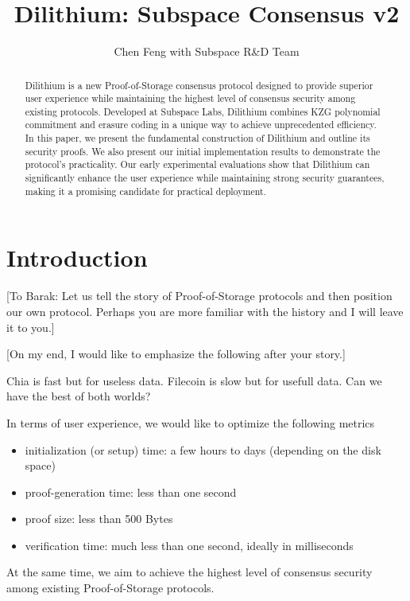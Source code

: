 \documentclass[12pt,draftcls,onecolumn]{IEEEtran}
\title{Dilithium: Subspace Consensus v2}
\author{Chen Feng with Subspace R\&D Team}
\begin{document}
\maketitle

\begin{abstract}
    Dilithium is a new Proof-of-Storage consensus protocol designed to provide superior
    user experience while maintaining the highest level 
    of consensus security among existing protocols.
    Developed at Subspace Labs, Dilithium combines KZG polynomial commitment and erasure coding
    in a unique way to achieve unprecedented efficiency. 
    In this paper, we present the fundamental construction of Dilithium
    and outline its security proofs. We also present our initial implementation results to demonstrate the protocol's practicality.
    Our early experimental evaluations show that Dilithium can significantly enhance the user experience while maintaining strong security guarantees, making it a promising candidate for practical deployment.
\end{abstract}

\section{Introduction}

[To Barak: Let us tell the story of Proof-of-Storage protocols and then position our own protocol. Perhaps you are more familiar with the history and I will leave it to you.]

[On my end, I would like to emphasize the following after your story.]


Chia is fast but for useless data. Filecoin is slow but for usefull data. Can we have the best of both worlds?

In terms of user experience, we would like to optimize the following metrics
\begin{itemize}
    \item initialization (or setup) time: a few hours to days (depending on the disk space)
    \item proof-generation time: less than one second
    \item proof size: less than 500 Bytes
    \item verification time: much less than one second, ideally in milliseconds
\end{itemize}
At the same time, we aim to achieve the highest level of {consensus security} among existing Proof-of-Storage protocols. 
\end{document}

